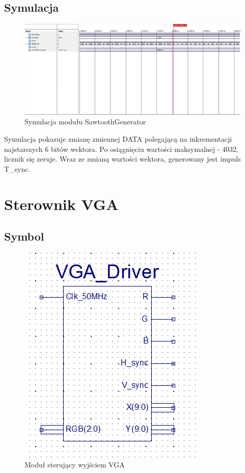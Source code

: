 \documentclass[a4paper]{report}
\begin{document}
		\begin{landscape}
			\subsection{Symulacja}
				\begin{figure}[h!]
					\centering
					\includegraphics[width=1.6\textwidth]{sawtooth_generator_symulacja2.png}
					\caption{Symulacja modułu SawtoothGenerator}
				\end{figure}
\justify Symulacja pokazuje zmianę zmiennej DATA polegającą na inkrementacji najstarszych 6 bitów wektora. Po osiągnięciu wartości maksymalnej - 4032,\\ licznik się zeruje. Wraz ze zmianą wartości wektora, generowany jest impuls T\_sync.
		\end{landscape}
		
		\newpage
	\section{Sterownik VGA}
		\subsection{Symbol}
			\begin{figure}[h!]
				\centering
				\includegraphics{vgadriver2.png}
				\caption{Moduł sterujący wyjściem VGA}
			\end{figure}
			
\end{document}
